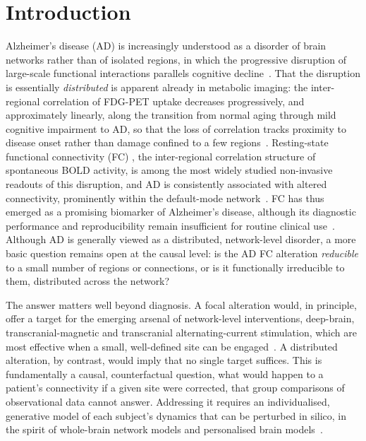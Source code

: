 \documentclass[11pt]{article}
\begin{document}
\section*{Introduction}
Alzheimer's disease (AD) is increasingly understood as a disorder of brain
networks rather than of isolated regions, in which the progressive disruption of
large-scale functional interactions parallels cognitive decline~\cite{seeley2009,delbeuck2003}.
That the disruption is essentially \emph{distributed} is apparent already in
metabolic imaging: the inter-regional correlation of FDG-PET uptake decreases
progressively, and approximately linearly, along the transition from normal
aging through mild cognitive impairment to AD, so that the loss of correlation
tracks proximity to disease onset rather than damage confined to a few
regions~\cite{pagani2016,pagani2017}.
Resting-state functional connectivity (FC)
, the inter-regional correlation structure of spontaneous BOLD activity, is
among the most widely studied non-invasive readouts of this disruption, and AD
is consistently associated with altered connectivity, prominently within the
default-mode network~\cite{greicius2004,sheline2013}. FC has thus emerged as a
promising biomarker of Alzheimer's disease, although its diagnostic performance
and reproducibility remain insufficient for routine clinical
use~\cite{buckner2013}. Although AD is generally
viewed as a distributed, network-level disorder, a more basic question remains
open at the causal level: is the AD FC alteration \emph{reducible} to a small
number of regions or connections, or is it functionally irreducible to them,
distributed across the network?

The answer matters well beyond diagnosis. A focal alteration would, in
principle, offer a target for the emerging arsenal of network-level
interventions, deep-brain, transcranial-magnetic and transcranial
alternating-current stimulation, which are most effective when a small,
well-defined site can be engaged~\cite{fox2014}. A
distributed alteration, by contrast, would imply that no single target suffices.
This is fundamentally a causal, counterfactual question, what would happen to a
patient's connectivity if a given site were corrected, that group comparisons
of observational data cannot answer. Addressing it requires an individualised,
generative model of each subject's dynamics that can be perturbed in silico, in
the spirit of whole-brain network models and personalised brain
models~\cite{honey2009,deco2011,sanzleon2013,jirsa2017,wang2019}.
\end{document}
